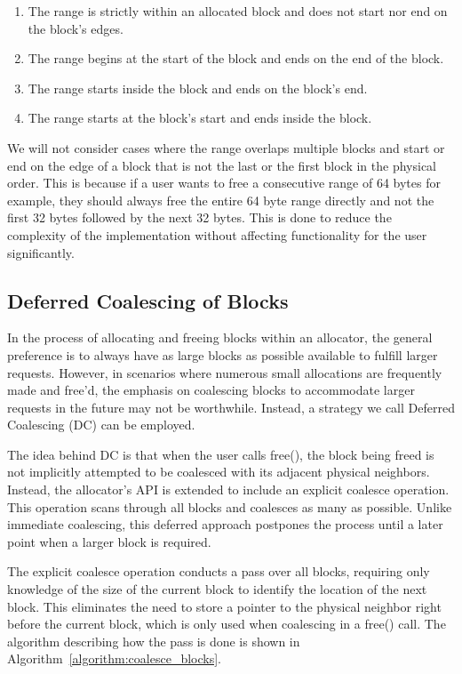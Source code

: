 \begin{enumerate}
    \item The range is strictly within an allocated block and does not start nor end on the block's edges.
    \item The range begins at the start of the block and ends on the end of the block.
    \item The range starts inside the block and ends on the block's end.
    \item The range starts at the block's start and ends inside the block.
\end{enumerate}

We will not consider cases where the range overlaps multiple blocks and start or end on the edge of a block that is not the last or the first block in the physical order. This is because if a user wants to free a consecutive range of 64 bytes for example, they should always free the entire 64 byte range directly and not the first 32 bytes followed by the next 32 bytes. This is done to reduce the complexity of the implementation without affecting functionality for the user significantly.

\subsection{Deferred Coalescing of Blocks}

In the process of allocating and freeing blocks within an allocator, the general preference is to always have as large blocks as possible available to fulfill larger requests. However, in scenarios where numerous small allocations are frequently made and free'd, the emphasis on coalescing blocks to accommodate larger requests in the future may not be worthwhile. Instead, a strategy we call Deferred Coalescing (DC) can be employed.

The idea behind DC is that when the user calls free(), the block being freed is not implicitly attempted to be coalesced with its adjacent physical neighbors. Instead, the allocator's API is extended to include an explicit coalesce operation. This operation scans through all blocks and coalesces as many as possible. Unlike immediate coalescing, this deferred approach postpones the process until a later point when a larger block is required.

The explicit coalesce operation conducts a pass over all blocks, requiring only knowledge of the size of the current block to identify the location of the next block. This eliminates the need to store a pointer to the physical neighbor right before the current block, which is only used when coalescing in a free() call. The algorithm describing how the pass is done is shown in Algorithm~\ref{algorithm:coalesce_blocks}.

